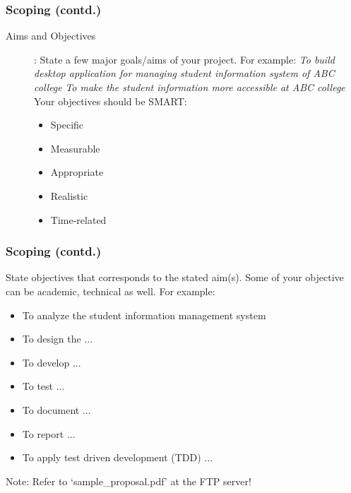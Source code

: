 \begin{frame}[t]\frametitle{Scoping (contd.)}
    \begin{description}
        \item[Aims and Objectives]:
    State a few major goals/aims of your project. For example:
    \emph{To build desktop application for managing student information system of ABC college}
    \emph{To make the student information more accessible at ABC college}\\

    Your objectives should be SMART:
    \begin{itemize}
        \item Specific
        \item Measurable
        \item Appropriate
        \item Realistic
        \item Time-related
    \end{itemize}
    \end{description}
\end{frame}

\begin{frame}[t]\frametitle{Scoping (contd.)}
    State objectives that corresponds to the stated aim(s).  Some of your objective can be academic, technical as well. For example:
    \begin{itemize}
        \item To analyze the student information management system
        \item To design the ...
        \item To develop ...
        \item To test ...
        \item To document ...
        \item To report ...
        \item To apply test driven development (TDD) ...
    \end{itemize}
Note: Refer to `sample\_proposal.pdf' at the FTP server!
\end{frame}

